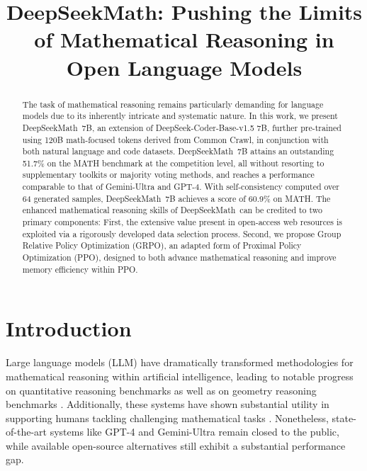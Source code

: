 \title{DeepSeekMath: Pushing the Limits of Mathematical Reasoning in Open Language Models}

\begin{abstract}
The task of mathematical reasoning remains particularly demanding for language models due to its inherently intricate and systematic nature. In this work, we present DeepSeekMath~7B, an extension of DeepSeek-Coder-Base-v1.5 7B, further pre-trained using 120B math-focused tokens derived from Common Crawl, in conjunction with both natural language and code datasets. DeepSeekMath~7B attains an outstanding 51.7\% on the MATH benchmark at the competition level, all without resorting to supplementary toolkits or majority voting methods, and reaches a performance comparable to that of Gemini-Ultra and GPT-4. With self-consistency computed over 64 generated samples, DeepSeekMath~7B achieves a score of 60.9\% on MATH. The enhanced mathematical reasoning skills of DeepSeekMath~can be credited to two primary components: First, the extensive value present in open-access web resources is exploited via a rigorously developed data selection process. Second, we propose Group Relative Policy Optimization (GRPO), an adapted form of Proximal Policy Optimization (PPO), designed to both advance mathematical reasoning and improve memory efficiency within PPO.
\end{abstract}

\section{Introduction}

Large language models (LLM) have dramatically transformed methodologies for mathematical reasoning within artificial intelligence, leading to notable progress on quantitative reasoning benchmarks \citep{MATH} as well as on geometry reasoning benchmarks \citep{trinh2024solving}. Additionally, these systems have shown substantial utility in supporting humans tackling challenging mathematical tasks \citep{tao}. Nonetheless, state-of-the-art systems like GPT-4 \citep{gpt4} and Gemini-Ultra \citep{gemini} remain closed to the public, while available open-source alternatives still exhibit a substantial performance gap.

